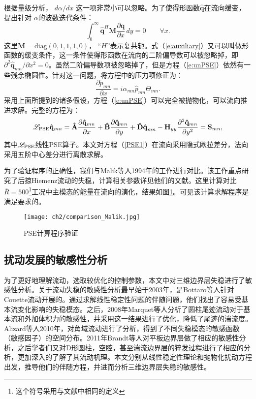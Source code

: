 根据量级分析\cite{Malik1999}， ${{d\alpha }}/{dx}$ 这一项非常小可以忽略。为了使得形函数$\mathbf{\hat q}$在流向缓变，提出针对 $\alpha$的波数迭代条件：
\begin{equation}
\label{e:auxiliary}
    \int_0^\infty  {{\mathbf{\hat q}}^H {\mathbf{M}}\frac{{\partial {\mathbf{\hat q}}}}{{\partial x}}\,dy}  = 0\qquad\forall x.
\end{equation}
这里$\mathbf{M}=\mathrm{diag}(0,1,1,1,0)$， ``$H$''表示复共轭。式（\ref{e:auxiliary}）又可以叫做形函数的缓变条件，这一条件使得形函数在流向的二阶偏导数可以被忽略掉，即${{\partial ^2 {\mathbf{\hat q}}_{mn} }}/{{\partial x^2 }}=0$\cite{Malik1994}。虽然二阶偏导数项被忽略掉了，但是方程（\ref{e:unPSE}）依然有一些残余椭圆性\cite{LiMalik1996}。针对这一问题，将方程中的压力项修正为：
\begin{equation}
    \frac{\partial \tilde p_{mn}}{\partial x} = i\alpha_{mn}\hat p_{mn}\Theta_{mn}.
\end{equation}
采用上面所提到的诸多假设，方程（\ref{e:unPSE}）可以完全被抛物化，可以流向推进求解。完整的方程为：
\begin{equation}
\label{PSE1}
    \mathscr{L}_{\rm PSE}{\mathbf{\hat q}}_{mn}  = {\mathbf{\hat A}}\frac{{\partial {\mathbf{\hat q}}_{mn} }}
    {{\partial x}} + {\mathbf{\hat B}}\frac{{\partial {\mathbf{\hat q}}_{mn} }}
    {{\partial y}} + {\mathbf{\hat D\hat q}}_{mn}  - {\mathbf{H}}_{yy} \frac{{\partial ^2 {\mathbf{\hat q}}_{mn} }}
    {{\partial y^2 }} = {\mathbf{S}}_{mn},
\end{equation}
其中$\mathscr{L}_{\rm PSE}$线性PSE算子。本文对方程（\ref{PSE1}）在流向采用隐式欧拉差分，法向采用五阶中心差分进行离散求解。

为了验证程序的正确性，我们与Malik等人1994年的工作\cite{Malik1994}进行对比。该工作重点研究了后掠Hiemenz流动的失稳，计算相关参数详见他们的文献。这里计算对比$\bar{R}=500$\footnote{这个符号采用与文献\cite{Malik1994}中相同的定义}工况中主模态的能量在流向的演化，结果如图\ref{f:com_malik}。可见该计算求解程序是满足要求的。
\begin{figure}
  \centering
  \texttt{[image: ch2/comparison\_Malik.jpg]}
  \caption{PSE计算程序验证}\label{f:com_malik}
\end{figure}


\subsection{扰动发展的敏感性分析}
为了更好地理解流动，选取较优化的控制参数，本文中对三维边界层失稳进行了敏感性分析。关于流动失稳的敏感性分析最早始于2003年，是Bottaro\cite{Bottaro2003}等人针对Couette流动开展的。通过求解线性稳定性问题的伴随问题，他们找出了容易受基本流变化影响的失稳模态。之后，2008年Marquet等人\cite{Marquet2008}分析了圆柱尾迹流动对于基本流和外加体积力的敏感性，并采用这一结果进行了优化，降低了尾迹的湍流度。Alizard等人\cite{Alizard2010}2010年，对角域流动进行了分析，得到了不同失稳模态的敏感函数（敏感因子）的空间分布。2011年Brandt等人\cite{Brandt2011}对平板边界层做了相应的敏感性分析，之后学者们又对D形圆柱\cite{Meliga2012}，空腔\cite{Bromwne2014}，甚至湍流边界层的猝发过程进行了相应的分析\cite{Alizard2015}，更加深入的了解了其流动机理。本文分别从线性稳定性理论和抛物化扰动方程出发，推导他们的伴随方程，并进而分析三维边界层失稳的敏感性。
